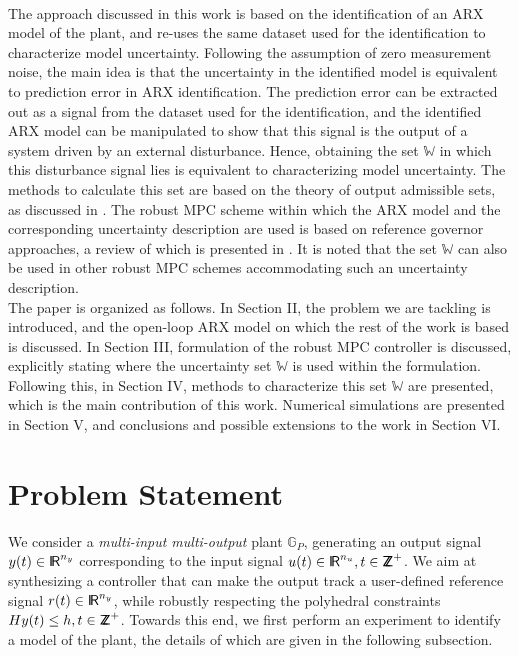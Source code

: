 \documentclass[letterpaper, 10 pt, conference]{ieeeconf}  %
\newcommand*{\RR}{%
	\textsf{I\kern-.3ex R}%
}
\newcommand*{\ZZ}{%
	\textsf{Z\kern-1ex Z}%
}
\begin{document}
 \\
 \indent
 The approach discussed in this work is based on the identification of an ARX model of the plant, and re-uses the same dataset used for the identification to characterize model uncertainty. Following the assumption of zero measurement noise, the main idea is that the uncertainty in the identified model is equivalent to prediction error in ARX identification. The prediction error can be extracted out as a signal from the dataset used for the identification, and the identified ARX model can be manipulated to show that this signal is the output of a system driven by an external disturbance.
 Hence, obtaining the set $\mathbb{W}$ in which this disturbance signal lies is equivalent to characterizing model uncertainty. The methods to calculate this set are based on the theory of output admissible sets, as discussed in \cite{531239}.
 \noindent
 The robust MPC scheme within which the ARX model and the corresponding uncertainty description are used is based on reference governor approaches, a review of which is presented in \cite{Garone:2017:RCG:3032127.3032157}. It is noted that the set $\mathbb{W}$ can also be used in other robust MPC schemes accommodating such an uncertainty description.
 \\
 \indent
 The paper is organized as follows. In Section II, the problem we are tackling is introduced, and the open-loop ARX model on which the rest of the work is based is discussed. In Section III, formulation of the robust MPC controller is discussed, explicitly stating where the uncertainty set $\mathbb{W}$ is used within the formulation. Following this, in Section IV, methods to characterize this set $\mathbb{W}$ are presented, which is the main contribution of this work. Numerical simulations are presented in Section V, and conclusions and possible extensions to the work in Section VI.
 
\section{Problem Statement}
We consider a \textit{multi-input multi-output} plant $\mathbb{G}_P$, generating an output signal $y(t) \in  \RR^{n_y}$ corresponding to the input signal $u(t) \in\RR^{n_u}, t \in \ZZ^+$. We aim at synthesizing a controller that can make the output track a user-defined reference signal $r(t) \in  \RR^{n_y}$, while robustly respecting the polyhedral constraints $Hy(t) \leq h , t \in \ZZ^+$. Towards this end, we first perform an experiment to identify a model of the plant, the details of which are given in the following subsection. 
\end{document}
